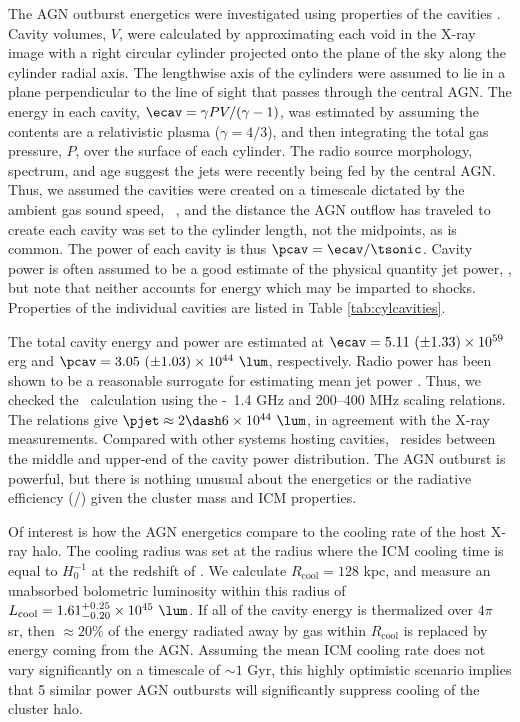 \documentclass[useAMS,usenatbib]{mn2e}
\begin{document}
The AGN outburst energetics were investigated using properties of the
cavities \citep[see][for a review]{mcnamrev}. Cavity volumes, $V$,
were calculated by approximating each void in the X-ray image with a
right circular cylinder projected onto the plane of the sky along the
cylinder radial axis. The lengthwise axis of the cylinders were
assumed to lie in a plane perpendicular to the line of sight that
passes through the central AGN. The energy in each cavity, $\ecav =
\gamma PV/(\gamma-1)$, was estimated by assuming the contents are a
relativistic plasma ($\gamma = 4/3$), and then integrating the total
gas pressure, $P$, over the surface of each cylinder. The radio source
morphology, spectrum, and age suggest the jets were recently being fed
by the central AGN. Thus, we assumed the cavities were created on a
timescale dictated by the ambient gas sound speed,
\tsonic\ \citep[see][]{birzan04}, and the distance the AGN outflow has
traveled to create each cavity was set to the cylinder length, not the
midpoints, as is common. The power of each cavity is thus $\pcav =
\ecav/\tsonic$. Cavity power is often assumed to be a good estimate of
the physical quantity jet power, \pjet, but note that neither accounts
for energy which may be imparted to shocks. Properties of the
individual cavities are listed in Table \ref{tab:cylcavities}.

The total cavity energy and power are estimated at $\ecav = 5.11 ~(\pm
1.33) \times 10^{59}$ erg and $\pcav = 3.05 ~(\pm 1.03) \times 10^{44}
~\lum$, respectively. Radio power has been shown to be a reasonable
surrogate for estimating mean jet power \citep{birzan08}. Thus, we
checked the \pcav\ calculation using the \citet{pjet} \pjet-\prad\ 1.4
GHz and 200--400 MHz scaling relations. The relations give $\pjet
\approx 2 \dash 6 \times 10^{44} ~\lum$, in agreement with the X-ray
measurements. Compared with other systems hosting cavities,
\irs\ resides between the middle and upper-end of the cavity power
distribution. The AGN outburst is powerful, but there is nothing
unusual about the energetics or the radiative efficiency (\prad/\pjet)
given the cluster mass and ICM properties.

Of interest is how the AGN energetics compare to the cooling rate of
the host X-ray halo. The cooling radius was set at the radius where
the ICM cooling time is equal to $H_0^{-1}$ at the redshift of
\irs. We calculate $R_{\mathrm{cool}} = 128$ kpc, and measure an
unabsorbed bolometric luminosity within this radius of
$L_{\mathrm{cool}} = 1.61^{+0.25}_{-0.20} \times 10^{45} ~\lum$. If
all of the cavity energy is thermalized over $4\pi$ sr, then $\approx
20\%$ of the energy radiated away by gas within $R_{\mathrm{cool}}$ is
replaced by energy coming from the AGN. Assuming the mean ICM cooling
rate does not vary significantly on a timescale of $\sim 1$ Gyr, this
highly optimistic scenario implies that 5 similar power AGN outbursts
will significantly suppress cooling of the cluster halo.
\end{document}
